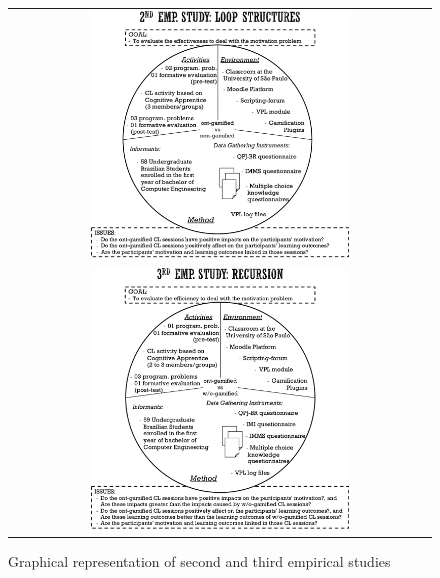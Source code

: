 \newpage
\begin{figure}[htb]
 \caption{Graphical representation of second and third empirical studies}
 \label{fig:graphical-second-third-empirical-study}
 \centering
 \begin{tabular}{c}
  \includegraphics[width=0.63\textwidth]{images/chap-evaluation/graphical-second-empirical-study}\\
  \includegraphics[width=0.63\textwidth]{images/chap-evaluation/graphical-third-empirical-study}
 \end{tabular}
 \fautor
\end{figure}

